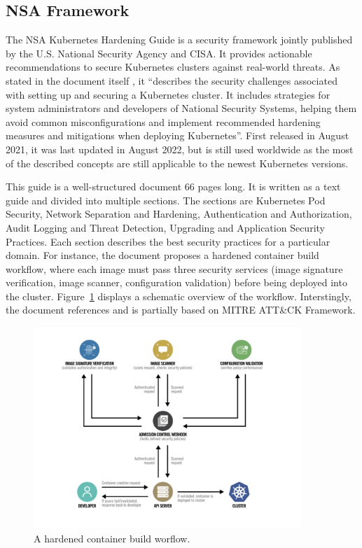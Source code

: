 \subsection{NSA Framework}

The NSA Kubernetes Hardening Guide is a security framework jointly published by the U.S. National Security Agency and CISA. It provides actionable recommendations to secure Kubernetes clusters against real-world threats. As stated in the document itself \cite{nsa-kubernetes-hardening-guide}, it ``describes the security challenges associated with setting up and securing a Kubernetes cluster. It includes strategies for system administrators and developers of National Security Systems, helping them avoid common misconfigurations and implement recommended hardening measures and mitigations when deploying Kubernetes''. First released in August 2021, it was last updated in August 2022, but is still used worldwide as the most of the described concepts are still applicable to the newest Kubernetes versions.

This guide is a well-structured document 66 pages long. It is written as a text guide and divided into multiple sections. The sections are Kubernetes Pod Security, Network Separation and Hardening, Authentication and Authorization, Audit Logging and Threat Detection, Upgrading and Application Security Practices. Each section describes the best security practices for a particular domain. For instance, the document proposes a hardened container build workflow, where each image must pass three security services (image signature verification, image scanner, configuration validation) before being deployed into the cluster. Figure~\ref{img:hardened-container-build-workflow} displays a schematic overview of the workflow. Interstingly, the document references and is partially based on MITRE ATT\&CK Framework.

\begin{figure}[!hbt]
	\begin{center}
		\includegraphics[width=0.9\textwidth]{images/hardened-container-build-workflow.png}
        \caption{A hardened container build worflow.}
		\label{img:hardened-container-build-workflow}
	\end{center}
\end{figure}

